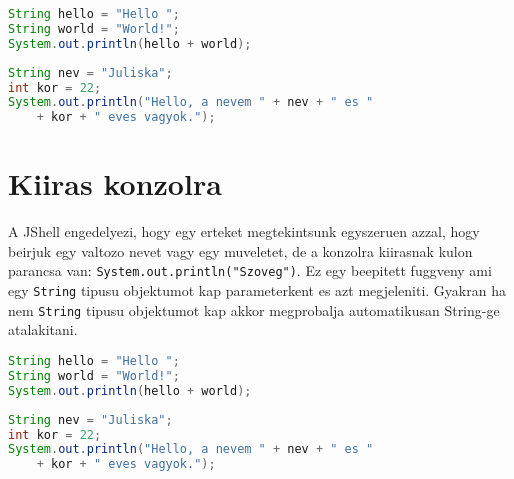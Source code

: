 \documentclass{article}
\begin{document}
\begin{lstlisting}[language=Java, caption=Konzolra kiiras 1.]
String hello = "Hello ";
String world = "World!";
System.out.println(hello + world);
\end{lstlisting}

\begin{lstlisting}[language=Java, caption=Konzolra kiiras 2.]
String nev = "Juliska";
int kor = 22;
System.out.println("Hello, a nevem " + nev + " es "
    + kor + " eves vagyok.");
\end{lstlisting}

\newpage

\section{Kiiras konzolra}

A JShell engedelyezi, hogy egy erteket megtekintsunk egyszeruen azzal, hogy beirjuk egy valtozo nevet vagy egy muveletet, de a konzolra kiirasnak kulon parancsa van: \lstinline{System.out.println("Szoveg")}.
Ez egy beepitett fuggveny ami egy \lstinline{String} tipusu objektumot kap parameterkent es azt megjeleniti. Gyakran ha nem \lstinline{String} tipusu objektumot kap akkor megprobalja automatikusan String-ge atalakitani.

\begin{lstlisting}[language=Java, caption=Konzolra kiiras 1.]
String hello = "Hello ";
String world = "World!";
System.out.println(hello + world);
\end{lstlisting}

\begin{lstlisting}[language=Java, caption=Konzolra kiiras 2.]
String nev = "Juliska";
int kor = 22;
System.out.println("Hello, a nevem " + nev + " es "
    + kor + " eves vagyok.");
\end{lstlisting}
\end{document}
